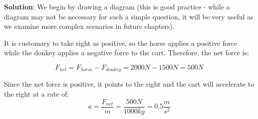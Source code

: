 \textbf{Solution}: We begin by drawing a diagram (this is good practice - while 
a diagram may not be necessary for such a simple question, it will be very useful 
as we examine more complex scenarios in future chapters). 

\begin{center}
\end{center}

It is customary to take right as positive, so the horse applies a positive force 
while the donkey applies a negative force to the cart. Therefore, the net force 
is:

$$F_{net} = F_{horse} - F_{donkey} = 2000N - 1500N = 500N$$

Since the net force is positive, it points to the right and the cart will 
accelerate to the right at a rate of:
$$a = \frac{F_{net}}{m} = \frac{500 N}{1000 kg} = 0.5 \frac{m}{s^2}$$

